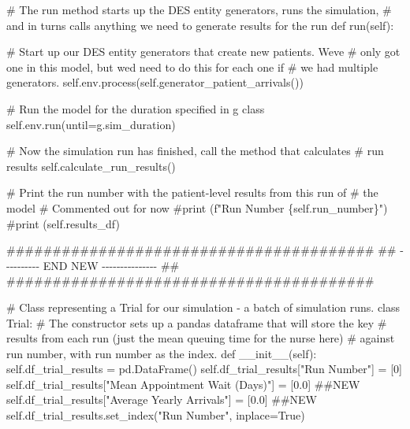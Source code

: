 \documentclass[
  letterpaper,
  DIV=11,
  numbers=noendperiod]{scrreprt}
\newenvironment{Shaded}{}{}
\newcommand{\CommentTok}[1]{\textcolor[rgb]{0.42,0.45,0.49}{#1}}
\newcommand{\DecValTok}[1]{\textcolor[rgb]{0.00,0.36,0.77}{#1}}
\newcommand{\FloatTok}[1]{\textcolor[rgb]{0.00,0.36,0.77}{#1}}
\newcommand{\FunctionTok}[1]{\textcolor[rgb]{0.44,0.26,0.76}{#1}}
\newcommand{\KeywordTok}[1]{\textcolor[rgb]{0.84,0.23,0.29}{#1}}
\newcommand{\NormalTok}[1]{\textcolor[rgb]{0.14,0.16,0.18}{#1}}
\newcommand{\OperatorTok}[1]{\textcolor[rgb]{0.14,0.16,0.18}{#1}}
\newcommand{\RegionMarkerTok}[1]{\textcolor[rgb]{0.42,0.45,0.49}{#1}}
\newcommand{\StringTok}[1]{\textcolor[rgb]{0.01,0.18,0.38}{#1}}
\newcommand{\VariableTok}[1]{\textcolor[rgb]{0.89,0.38,0.04}{#1}}
\begin{document}
\begin{tcolorbox}
\begin{Shaded}
\begin{Highlighting}[]
    \CommentTok{\# The run method starts up the DES entity generators, runs the simulation,}
    \CommentTok{\# and in turns calls anything we need to generate results for the run}
    \KeywordTok{def}\NormalTok{ run(}\VariableTok{self}\NormalTok{):}

        \CommentTok{\# Start up our DES entity generators that create new patients.  We\textquotesingle{}ve}
        \CommentTok{\# only got one in this model, but we\textquotesingle{}d need to do this for each one if}
        \CommentTok{\# we had multiple generators.}
        \VariableTok{self}\NormalTok{.env.process(}\VariableTok{self}\NormalTok{.generator\_patient\_arrivals())}

        \CommentTok{\# Run the model for the duration specified in g class}
        \VariableTok{self}\NormalTok{.env.run(until}\OperatorTok{=}\NormalTok{g.sim\_duration)}

        \CommentTok{\# Now the simulation run has finished, call the method that calculates}
        \CommentTok{\# run results}
        \VariableTok{self}\NormalTok{.calculate\_run\_results()}

        \CommentTok{\# Print the run number with the patient{-}level results from this run of}
        \CommentTok{\# the model}
        \CommentTok{\# Commented out for now}
        \CommentTok{\#print (f"Run Number \{self.run\_number\}")}
        \CommentTok{\#print (self.results\_df)}

    \CommentTok{\#\#\#\#\#\#\#\#\#\#\#\#\#\#\#\#\#\#\#\#\#\#\#\#\#\#\#\#\#\#\#\#\#\#\#\#\#\#\#\#}
    \CommentTok{\#\# {-}{-}{-}{-}{-}{-}{-}{-}{-}{-} }\RegionMarkerTok{END}\CommentTok{ NEW {-}{-}{-}{-}{-}{-}{-}{-}{-}{-}{-}{-}{-}{-}{-} \#\#}
    \CommentTok{\#\#\#\#\#\#\#\#\#\#\#\#\#\#\#\#\#\#\#\#\#\#\#\#\#\#\#\#\#\#\#\#\#\#\#\#\#\#\#\#}

\CommentTok{\# Class representing a Trial for our simulation {-} a batch of simulation runs.}
\KeywordTok{class}\NormalTok{ Trial:}
    \CommentTok{\# The constructor sets up a pandas dataframe that will store the key}
    \CommentTok{\# results from each run (just the mean queuing time for the nurse here)}
    \CommentTok{\# against run number, with run number as the index.}
    \KeywordTok{def}  \FunctionTok{\_\_init\_\_}\NormalTok{(}\VariableTok{self}\NormalTok{):}
        \VariableTok{self}\NormalTok{.df\_trial\_results }\OperatorTok{=}\NormalTok{ pd.DataFrame()}
        \VariableTok{self}\NormalTok{.df\_trial\_results[}\StringTok{"Run Number"}\NormalTok{] }\OperatorTok{=}\NormalTok{ [}\DecValTok{0}\NormalTok{]}
        \VariableTok{self}\NormalTok{.df\_trial\_results[}\StringTok{"Mean Appointment Wait (Days)"}\NormalTok{] }\OperatorTok{=}\NormalTok{ [}\FloatTok{0.0}\NormalTok{] }\CommentTok{\#\#NEW}
        \VariableTok{self}\NormalTok{.df\_trial\_results[}\StringTok{"Average Yearly Arrivals"}\NormalTok{] }\OperatorTok{=}\NormalTok{ [}\FloatTok{0.0}\NormalTok{] }\CommentTok{\#\#NEW}
        \VariableTok{self}\NormalTok{.df\_trial\_results.set\_index(}\StringTok{"Run Number"}\NormalTok{, inplace}\OperatorTok{=}\VariableTok{True}\NormalTok{)}


\end{Highlighting}
\end{Shaded}
\end{tcolorbox}
\end{document}
